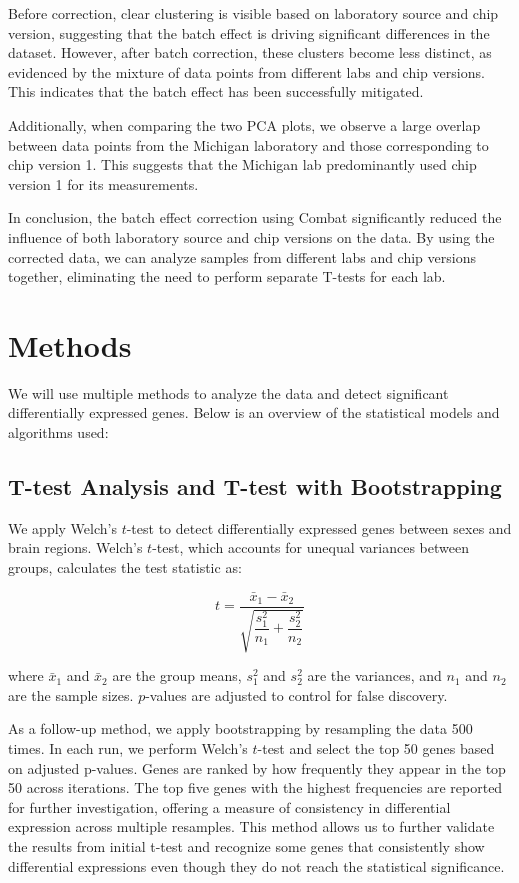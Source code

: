 \documentclass[12pt]{article}
\begin{document}
Before correction, clear clustering is visible based on laboratory source and chip version, suggesting that the batch effect is driving significant differences in the dataset. However, after batch correction, these clusters become less distinct, as evidenced by the mixture of data points from different labs and chip versions. This indicates that the batch effect has been successfully mitigated.

Additionally, when comparing the two PCA plots, we observe a large overlap between data points from the Michigan laboratory and those corresponding to chip version 1. This suggests that the Michigan lab predominantly used chip version 1 for its measurements.

In conclusion, the batch effect correction using Combat significantly reduced the influence of both laboratory source and chip versions on the data. By using the corrected data, we can analyze samples from different labs and chip versions together, eliminating the need to perform separate T-tests for each lab.


\section{Methods}
We will use multiple methods to analyze the data and detect significant differentially expressed genes. Below is an overview of the statistical models and algorithms used:

\subsection{T-test Analysis and T-test with Bootstrapping}

We apply Welch’s $t$-test to detect differentially expressed genes between sexes and brain regions. Welch’s $t$-test, which accounts for unequal variances between groups, calculates the test statistic as:

\[
t = \frac{\bar{x}_1 - \bar{x}_2}{\sqrt{\dfrac{s_1^2}{n_1} + \dfrac{s_2^2}{n_2}}}
\]

where $\bar{x}_1$ and $\bar{x}_2$ are the group means, $s_1^2$ and $s_2^2$ are the variances, and $n_1$ and $n_2$ are the sample sizes. $p$-values are adjusted to control for false discovery.

As a follow-up method, we apply bootstrapping by resampling the data 500 times. In each run, we perform Welch's $t$-test and select the top 50 genes based on adjusted p-values. Genes are ranked by how frequently they appear in the top 50 across iterations. The top five genes with the highest frequencies are reported for further investigation, offering a measure of consistency in differential expression across multiple resamples. This method allows us to further validate the results from initial t-test and recognize some genes that consistently show differential expressions even though they do not reach the statistical significance.
\end{document}

